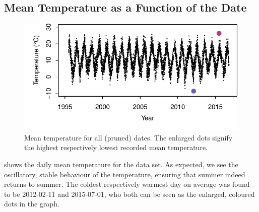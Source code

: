 \documentclass[10pt]{article}\usepackage[]{graphicx}\usepackage[]{color}
\makeatletter
\def\maxwidth{ %
  \ifdim\Gin@nat@width>\linewidth
    \linewidth
  \else
    \Gin@nat@width
  \fi
}
\newenvironment{knitrout}{}{} %
\theoremstyle{plain}
\makeatother
\begin{document}
\subsection{Mean Temperature as a Function of the Date}
\begin{knitrout}
\color{fgcolor}\begin{figure}[H]

{\centering \includegraphics[width=\maxwidth]{figure/graphics-meantemp-1} 

}

\caption[Mean temperature for all (pruned) dates]{Mean temperature for all (pruned) dates. The enlarged dots signify the highest respectively lowest recorded mean temperature.}\label{fig:meantemp}
\end{figure}


\end{knitrout}

 shows the daily mean temperature for the data set. As expected, we see the oscillatory, stable behaviour of the temperature, ensuring that summer indeed returns to summer. The coldest respectively warmest day on average was found to be 2012-02-11 and 2015-07-01, who both can be seen as the enlarged, coloured dots in the graph.
\end{document}
